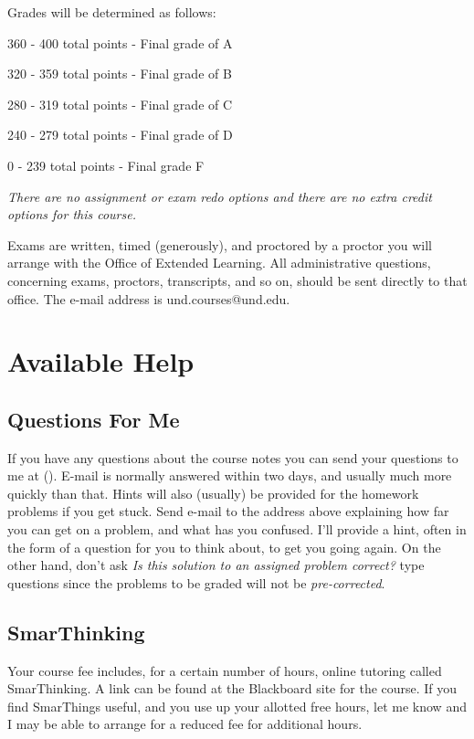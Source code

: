 \documentclass[11pt]{amsart}
\begin{document}
\hskip 1in Grades will be determined as follows:\par
\hskip 1in 360 - 400 total points - Final grade of A\par
\hskip 1in 320 - 359 total points - Final grade of B\par
\hskip 1in 280 - 319 total points - Final grade of C\par
\hskip 1in 240 - 279 total points - Final grade of D\par
\hskip 1in 0 - 239 total points - Final grade F

\vskip 3pt

\begin{center}
{\it There are no assignment or exam redo options and there are no extra credit options for this course.} 
\end{center}

Exams are written, timed (generously), and proctored by a proctor you will arrange with the Office of Extended Learning. All administrative questions, concerning exams, proctors, transcripts, and so on, should be sent directly to that office. The e-mail address is und.courses@und.edu.

\section{Available Help}

\subsection{Questions For Me}


If you have any questions about the course notes you can send your 
questions to me at ({\color{red}{email:   jm.metzger@und.edu}}).   
E{-}mail is normally answered within two days, and usually much more quickly than that. 
Hints will also (usually) be provided for the homework problems
if you get stuck. Send e-mail to the address above explaining how far
you can get on a problem, and what has you confused. I'll provide
a hint, often in the form of a question for you to think about,  to get you going again.
On the other hand, don't ask {\it Is this solution to an assigned problem correct?} type
questions since the problems to be graded will not be {\it pre-corrected}.



\subsection{SmarThinking}
Your
course fee includes, for a certain number of hours, online tutoring
called SmarThinking. A link can be found at the Blackboard site for the course.
If you find SmarThings useful, and you use up your allotted free hours, let me know and I may be able to 
arrange for a reduced fee for additional hours.
\end{document}
